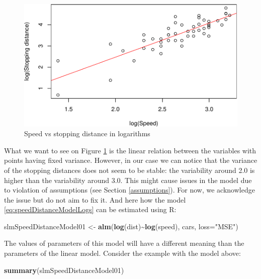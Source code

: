 \documentclass[
]{book}
\newenvironment{Shaded}{\begin{snugshade}}{\end{snugshade}}
\newcommand{\DataTypeTok}[1]{\textcolor[rgb]{0.13,0.29,0.53}{#1}}
\newcommand{\KeywordTok}[1]{\textcolor[rgb]{0.13,0.29,0.53}{\textbf{#1}}}
\newcommand{\NormalTok}[1]{#1}
\newcommand{\OperatorTok}[1]{\textcolor[rgb]{0.81,0.36,0.00}{\textbf{#1}}}
\newcommand{\StringTok}[1]{\textcolor[rgb]{0.31,0.60,0.02}{#1}}
\theoremstyle{definition}
\theoremstyle{definition}
\theoremstyle{definition}
\theoremstyle{definition}
\theoremstyle{remark}
\begin{document}
\begin{figure}
\centering
\includegraphics{Svetunkov---Statistics-for-Business-Analytics_files/figure-latex/speedDistanceLogs-1.pdf}
\caption{\label{fig:speedDistanceLogs}Speed vs stopping distance in logarithms}
\end{figure}

What we want to see on Figure \ref{fig:speedDistanceLogs} is the linear relation between the variables with points having fixed variance. However, in our case we can notice that the variance of the stopping distances does not seem to be stable: the variability around 2.0 is higher than the variability around 3.0. This might cause issues in the model due to violation of assumptions (see Section \ref{assumptions}). For now, we acknowledge the issue but do not aim to fix it. And here how the model \eqref{eq:speedDistanceModelLogs} can be estimated using R:

\begin{Shaded}
\begin{Highlighting}[]
\NormalTok{slmSpeedDistanceModel01 \textless{}{-}}\StringTok{ }\KeywordTok{alm}\NormalTok{(}\KeywordTok{log}\NormalTok{(dist)}\OperatorTok{\textasciitilde{}}\KeywordTok{log}\NormalTok{(speed), cars, }\DataTypeTok{loss=}\StringTok{"MSE"}\NormalTok{)}
\end{Highlighting}
\end{Shaded}

The values of parameters of this model will have a different meaning than the parameters of the linear model. Consider the example with the model above:

\begin{Shaded}
\begin{Highlighting}[]
\KeywordTok{summary}\NormalTok{(slmSpeedDistanceModel01)}
\end{Highlighting}
\end{Shaded}
\end{document}
